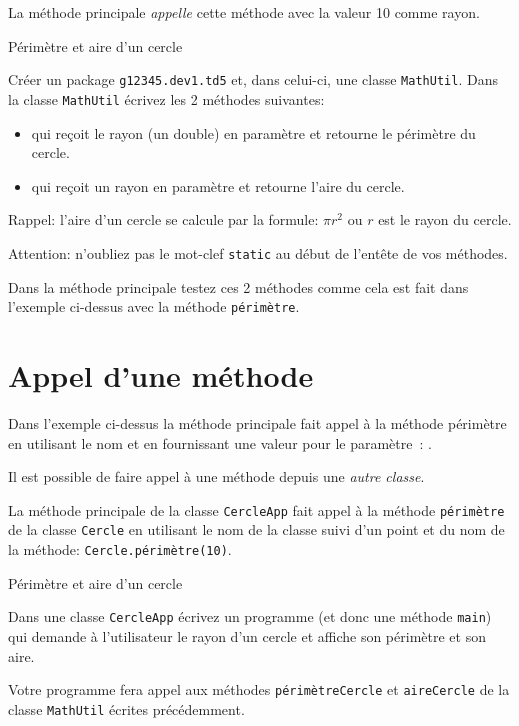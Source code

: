 \documentclass[a4paper,11pt]{article}
\begin{document}
	La méthode principale \emph{appelle}  cette méthode avec la valeur 10 comme rayon. 


	 \begin{Exercice}{Périmètre et aire d'un cercle}
		
		Créer un package \texttt{g12345.dev1.td5} et, dans celui-ci, une classe \texttt{MathUtil}.
		Dans la classe \texttt{MathUtil} écrivez les 2 méthodes suivantes: 
		\begin{itemize}
			\item	{} 
				qui reçoit le rayon (un double) en paramètre et retourne le périmètre du cercle.
			\item {} 
				qui reçoit un rayon en paramètre et retourne l'aire du cercle.
		\end{itemize}
		
		Rappel: l'aire d'un cercle se calcule par la formule: $\pi r^2$ ou  $r$ est le rayon du cercle.
		
		Attention: n'oubliez pas le mot-clef \texttt{static} au début de l'entête de vos méthodes.
		
		Dans la méthode principale testez ces 2 méthodes comme cela est fait dans l'exemple ci-dessus avec la méthode 
		\texttt{périmètre}.
	\end{Exercice} 


\section{Appel d'une méthode}

	Dans l'exemple ci-dessus la méthode principale fait appel à la méthode périmètre en utilisant le nom 
	et en fournissant une valeur pour le paramètre~: 
	.
	
	Il est possible de faire appel à une méthode depuis une \emph{autre classe}.
	

	La méthode principale de la classe \texttt{CercleApp} fait appel à la méthode \texttt{périmètre}
	de la classe \texttt{Cercle} en utilisant le nom de la classe suivi d'un point et du nom de la méthode: \texttt{Cercle.périmètre(10)}.
	
	 \begin{Exercice}{Périmètre et aire d'un cercle}
		
		Dans une classe \texttt{CercleApp} écrivez un programme (et donc une méthode \texttt{main})
		qui demande à l'utilisateur le rayon d'un cercle et affiche son périmètre et son aire.
		
		Votre programme fera appel aux méthodes \texttt{périmètreCercle} et \texttt{aireCercle} de la classe
		\texttt{MathUtil} écrites précédemment.
	\end{Exercice} 
	
\end{document}
